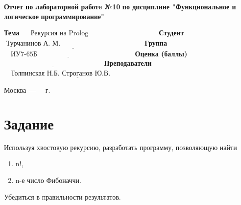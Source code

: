 \documentclass[14pt]{report}
\begin{document}
\begin{titlepage}
	
	\begin{center}
		\noindent\begin{minipage}{1.3\textwidth}\centering
			\Large\textbf{  Отчет по лабораторной работe №10}\newline
			\textbf{по дисциплине "Функциональное и логическое}\newline
			\textbf{программирование"}\newline\newline
		\end{minipage}
	\end{center}
	
	\noindent\textbf{Тема} $\underline{\text{~~~~Рекурсия на Prolog~~~~~~~~~~~~~~~~~~~~~~~~~~~~~~}}$\newline\newline
	\noindent\textbf{Студент} $\underline{\text{~Турчанинов А. М.~~~~~~~~~~~~~~~~~~~~~~~~~~~~~~~~~~~~}}$\newline\newline
	\noindent\textbf{Группа} $\underline{\text{~~~ИУ7-65Б~~~~~~~~~~~~~~~~~~~~~~~~~~~~~~~~~~~~~~~~~~}}$\newline\newline
	\noindent\textbf{Оценка (баллы)} $\underline{\text{~~~~~~~~~~~~~~~~~~~~~~~~~~~~~~~~~~~~~~~~~~~}}$\newline\newline
	\noindent\textbf{Преподаватели} $\underline{\text{~~~Толпинская Н.Б. Строганов Ю.В.~~~~~~~~~~~~~~~~~~}}$\newline\newline\newline
	
	\begin{center}
		\vfill
		Москва~---~\the\year
		~г.
	\end{center}
\end{titlepage}

\newpage

\section*{Задание}

Используя хвостовую рекурсию, разработать программу, позволяющую найти
\begin{enumerate}
    \item n!,
    \item n-е число Фибоначчи.
\end{enumerate}

Убедиться в правильности результатов.
\end{document}
